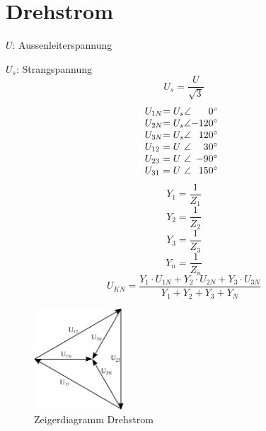 



\chapter{Drehstrom}
\newpage
%
%
$U$: Aussenleiterspannung

$U_s$: Strangspannung
\[ U_s = \frac{U}{\sqrt{3}} \]
\[ \begin{array}{@{}l@{}l@{}l@{}r}
U_{1N} &= U_s &\angle &   0^\circ \\
U_{2N} &= U_s &\angle &-120^\circ \\
U_{3N} &= U_s &\angle & 120^\circ \\
U_{12} &= U   &\angle &  30^\circ \\
U_{23} &= U   &\angle & -90^\circ \\
U_{31} &= U   &\angle & 150^\circ 
\end{array} \]
\[ Y_1 = \frac{1}{Z_1} \]
\[ Y_2 = \frac{1}{Z_2} \]
\[ Y_3 = \frac{1}{Z_3} \]
\[ Y_n = \frac{1}{Z_n} \]
\[ U_{KN} = \frac{Y_1 \cdot U_{1N} + Y_2 \cdot U_{2N} + Y_3 \cdot U_{3N}}
{Y_1 + Y_2 + Y_3 + Y_N} \]
\begin{figure}[h!]
  \centering
  \includegraphics[width=0.3\textwidth]{../fig/drehstrom.pdf}
  \caption{Zeigerdiagramm Drehstrom}
  \label{fig:zeig_dreh}
\end{figure}
